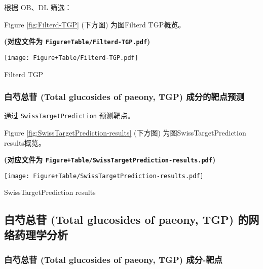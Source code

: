 \documentclass[
]{article}
\begin{document}
根据 OB、DL 筛选：

Figure \ref{fig:Filterd-TGP} (下方图) 为图Filterd TGP概览。

\textbf{(对应文件为 \texttt{Figure+Table/Filterd-TGP.pdf})}

\def\@captype{figure}
\begin{center}
\texttt{[image: Figure+Table/Filterd-TGP.pdf]}
\caption{Filterd TGP}\label{fig:Filterd-TGP}
\end{center}

\hypertarget{ux767dux828dux603bux82f7-total-glucosides-of-paeony-tgp-ux6210ux5206ux7684ux9776ux70b9ux9884ux6d4b}{%
\subsubsection{白芍总苷 (Total glucosides of paeony, TGP) 成分的靶点预测}\label{ux767dux828dux603bux82f7-total-glucosides-of-paeony-tgp-ux6210ux5206ux7684ux9776ux70b9ux9884ux6d4b}}

通过 \texttt{SwissTargetPrediction} 预测靶点。

Figure \ref{fig:SwissTargetPrediction-results} (下方图) 为图SwissTargetPrediction results概览。

\textbf{(对应文件为 \texttt{Figure+Table/SwissTargetPrediction-results.pdf})}

\def\@captype{figure}
\begin{center}
\texttt{[image: Figure+Table/SwissTargetPrediction-results.pdf]}
\caption{SwissTargetPrediction results}\label{fig:SwissTargetPrediction-results}
\end{center}

\hypertarget{ux767dux828dux603bux82f7-total-glucosides-of-paeony-tgp-ux7684ux7f51ux7edcux836fux7406ux5b66ux5206ux6790}{%
\subsection{白芍总苷 (Total glucosides of paeony, TGP) 的网络药理学分析}\label{ux767dux828dux603bux82f7-total-glucosides-of-paeony-tgp-ux7684ux7f51ux7edcux836fux7406ux5b66ux5206ux6790}}

\hypertarget{ux767dux828dux603bux82f7-total-glucosides-of-paeony-tgp-ux6210ux5206-ux9776ux70b9}{%
\subsubsection{白芍总苷 (Total glucosides of paeony, TGP) 成分-靶点}\label{ux767dux828dux603bux82f7-total-glucosides-of-paeony-tgp-ux6210ux5206-ux9776ux70b9}}
\end{document}
